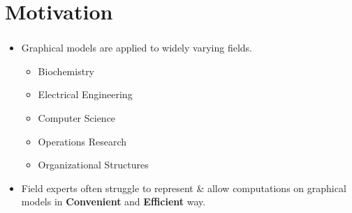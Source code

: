 \documentclass[mathserif,10pt]{beamer}
\newcommand{\cmt}[1]{}
\begin{document}
\section{Motivation}
\frame
{
  \frametitle{\secname}
  \begin{itemize}%
    \item Graphical models are applied to widely varying fields.
    \begin{itemize}
      \item Biochemistry 
        \cmt{genomics}
      \item Electrical Engineering
        \cmt{communication networks }
      \item Computer Science
        \cmt{Algorithms and computation}
      \item Operations Research
        \cmt{Scheduling}
      \item Organizational Structures 
        \cmt{social networking}
    \end{itemize} 
    \vspace{1cm}
    \item Field experts often struggle to represent \& allow computations on  graphical models in \textbf{Convenient} and \textbf{Efficient} way.
      \cmt{
Convenience: is essential so that even for domain experts who are not coding experts
can code and reason about their implementation. Ease of interface could be due to:
– Expressive power of the language representing those models.
– Intuitive extensibility of the language.
– Ability of the language to provide exploratory programming, where the user may
experiment with different ideas (without dwelling much into the language syntax)
before coming to a conclusive one.

Designed language need to be efficient in the following sense.
– Underlying design decisions including data structures need to be carefully crafted to
achieve expected run-time w.r.t the input size.
– Implementation need to be scalable w.r.t the space/time requirements. This is im-
portant because most of the graph algorithm typically work on huge input sizes.

To meet all above goals and most importantly exploratory programming, we decided to work
on a dynamically typed language to represent graphs and apply various computations on them.
With a dynamically typed language the user do not have to worry much about declaring types
and can focus mostly on his/her experiments.
      }
    \vspace{1cm}
  \end{itemize} 
}
\end{document}
